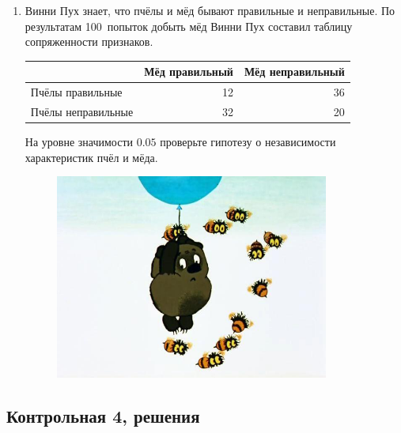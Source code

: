 \begin{enumerate}
\item Винни Пух знает, что пчёлы и мёд бывают правильные и неправильные. По результатам 100~попыток добыть мёд Винни Пух составил таблицу сопряженности признаков.


\begin{tabular}{lrr}
\toprule
 & Мёд правильный & Мёд неправильный \\
\midrule
Пчёлы правильные & 12	& 36 \\
Пчёлы неправильные & 32	& 20 \\
\bottomrule
\end{tabular}


На уровне значимости $0.05$ проверьте гипотезу о независимости характеристик пчёл и мёда.


\begin{figure}[b]
\centering
\includegraphics[width=9cm]{images/winnie_kr_4}
\end{figure}



\end{enumerate}


\subsection{Контрольная 4, решения}


